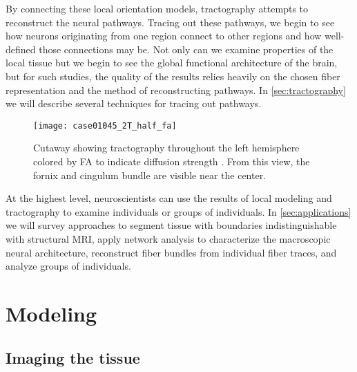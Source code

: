 \documentclass[final,hyperref]{gatech-thesis}
\begin{document}
By connecting these local orientation models, tractography attempts to
reconstruct the neural pathways.  Tracing out these pathways, we begin to see
how neurons originating from one region connect to other regions and how
well-defined those connections may be.  Not only can we examine properties of
the local tissue but we begin to see the global functional architecture of the
brain, but for such studies, the quality of the results relies heavily on the
chosen fiber representation and the method of reconstructing pathways.
%
In \autoref{sec:tractography} we will describe several techniques for tracing
out pathways.

\begin{figure}[t]
  \centering
  \texttt{[image: case01045\_2T\_half\_fa]}%
 \caption{Cutaway showing tractography throughout the left hemisphere colored
   by FA to indicate diffusion strength \cite{Malcolm2009ipmi}.  From this
   view, the fornix and cingulum bundle are visible near the center.}
  \label{fig:rh_fa}
\end{figure}




At the highest level, neuroscientists can use the results of local modeling
and tractography to examine individuals or groups of individuals.
%
In \autoref{sec:applications} we will survey approaches to segment tissue with
boundaries indistinguishable with structural MRI, apply network analysis to
characterize the macroscopic neural architecture, reconstruct fiber bundles
from individual fiber traces, and analyze groups of individuals.




\section{Modeling} \label{sec:modeling}

\subsection{Imaging the tissue}
\end{document}
